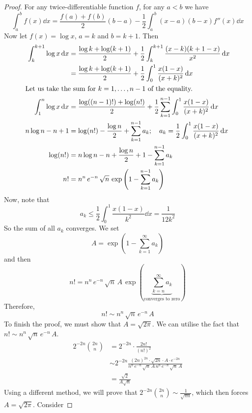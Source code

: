 \begin{proof}
	For any twice-differentiable function \(f\), for any \(a < b\) we have
	\[ \int_a^b f(x) \dd{x} = \frac{f(a) + f(b)}{2} (b - a) - \frac{1}{2}\int_a^b (x-a)(b-x)f''(x)\dd{x} \]
	Now let \(f(x) = \log x\), \(a=k\) and \(b=k+1\). Then
	\begin{align*}
		\int_k^{k+1} \log x \dd{x} & = \frac{\log k + \log(k+1)}{2} + \frac{1}{2}\int_k^{k+1} \frac{(x-k)(k+1-x)}{x^2}\dd{x}                            \\
		                           & = \frac{\log k + \log(k+1)}{2} + \frac{1}{2}\int_0^1 \frac{x(1-x)}{(x+k)^2}\dd{x}                                  \\
		\intertext{Let us take the sum for \(k=1, \dots, n-1\) of the equality.}
		\int_1^n \log x \dd{x}     & = \frac{\log ((n-1)!) + \log(n!)}{2} + \frac{1}{2}\sum_{k=1}^{n-1}\int_0^1 \frac{x(1-x)}{(x+k)^2}\dd{x}            \\
		n\log n - n + 1            & = \log (n!) - \frac{\log n}{2} + \sum_{k=1}^{n-1} a_k;\quad a_k = \frac{1}{2}\int_0^1 \frac{x(1-x)}{(x+k)^2}\dd{x} \\
		\log (n!)                  & = n \log n - n + \frac{\log n}{2} + 1 - \sum_{k=1}^{n-1} a_k                                                       \\
		n!                         & = n^n \, e^{-n} \, \sqrt n \, \exp\left( 1 - \sum_{k=1}^{n-1} a_k \right)
	\end{align*}
	Now, note that
	\[ a_k \leq \frac{1}{2}\int_0^1 \frac{x(1-x)}{k^2}\dd{x} = \frac{1}{12k^2} \]
	So the sum of all \(a_k\) converges. We set
	\[ A = \exp\left( 1 - \sum_{k=1}^\infty a_k \right) \]
	and then
	\[ n! = n^n \, e^{-n} \, \sqrt n \, A \, \exp\left( \underbrace{\sum_{k=n}^\infty a_k}_{\text{converges to zero}} \right) \]
	Therefore,
	\[ n! \sim n^n\, \sqrt{n}\, e^{-n}\, A \]
	To finish the proof, we must show that \(A = \sqrt{2 \pi}\). We can utilise the fact that \(n! \sim n^n\, \sqrt{n}\, e^{-n}\, A\).
	\begin{align*}
		2^{-2n} \binom{2n}{n} & = 2^{-2n} \cdot \frac{2n!}{(n!)^2}                                                                                           \\
		                      & \sim 2^{-2n} \frac{(2n)^{2n} \cdot \sqrt{2n} \cdot A \cdot e^{-2n}}{n^n\, e^{-n}\, \sqrt n\, A\, n^n\, e^{-n}\, \sqrt n\, A} \\
		                      & = \frac{\sqrt{2}}{A\sqrt{n}}
	\end{align*}
	Using a different method, we will prove that \(2^{-2n} \binom{2n}{n} \sim \frac{1}{\sqrt{\pi n}}\), which then forces \(A = \sqrt{2\pi}\). Consider

\end{proof}
